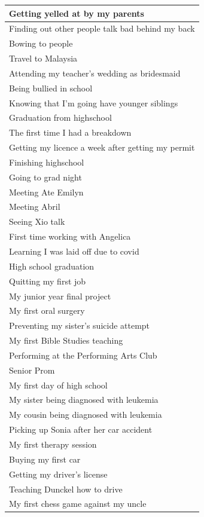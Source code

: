 \documentclass[
  .7em,
  letterpaper,
  DIV=11,
  numbers=noendperiod]{scrartcl}
\begin{document}
\begin{table}
\begin{tabular}{l}
\hline
Getting yelled at by my parents\\
\hline
Finding out other people talk bad behind my back\\
\hline
Bowing to people\\
\hline
Travel to Malaysia\\
\hline
Attending my teacher's wedding as bridesmaid\\
\hline
Being bullied in school\\
\hline
Knowing that I'm going have younger siblings\\
\hline
Graduation from highschool\\
\hline
The first time I had a breakdown\\
\hline
Getting my licence a week after getting my permit\\
\hline
Finishing highschool\\
\hline
Going to grad night\\
\hline
Meeting Ate Emilyn\\
\hline
Meeting Abril\\
\hline
Seeing Xio talk\\
\hline
First time working with Angelica\\
\hline
Learning I was laid off due to covid\\
\hline
High school graduation\\
\hline
Quitting my first job\\
\hline
My junior year final project\\
\hline
My first oral surgery\\
\hline
Preventing my sister's suicide attempt\\
\hline
My first Bible Studies teaching\\
\hline
Performing at the Performing Arts Club\\
\hline
Senior Prom\\
\hline
My first day of high school\\
\hline
My sister being diagnosed with leukemia\\
\hline
My cousin being diagnosed with leukemia\\
\hline
Picking up Sonia after her car accident\\
\hline
My first therapy session\\
\hline
Buying my first car\\
\hline
Getting my driver's license\\
\hline
Teaching Dunckel how to drive\\
\hline
My first chess game against my uncle\\

\end{tabular}
\end{table}
\end{document}
